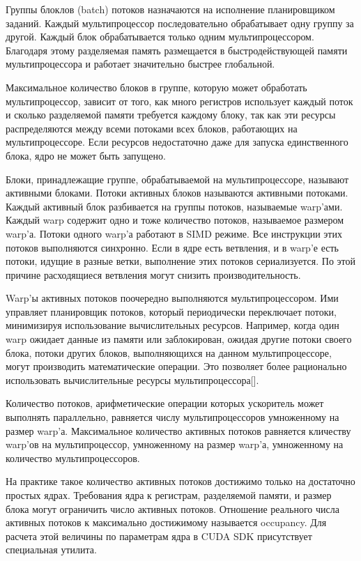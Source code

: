Группы блоклов (batch) потоков назначаются на исполнение планировщиком заданий. Каждый мультипроцессор последовательно обрабатывает одну группу за другой. Каждый блок обрабатывается только одним мультипроцессором. Благодаря этому разделяемая память размещается в быстродействующей памяти мультипроцессора и работает значительно быстрее глобальной.

Максимальное количество блоков в группе, которую может обработать мультипроцессор, зависит от того, как много регистров использует каждый поток и сколько разделяемой памяти требуется каждому блоку, так как эти ресурсы распределяются между всеми потоками всех блоков, работающих на мультипроцессоре. Если ресурсов недостаточно даже для запуска единственного блока, ядро не может быть запущено.

Блоки, принадлежащие группе, обрабатываемой на мультипроцессоре, называют активными блоками. Потоки активных блоков называются активными потоками. Каждый активный блок разбивается на группы потоков, называемые warp'ами. Каждый warp содержит одно и тоже количество потоков, называемое размером warp'а. Потоки одного warp'а работают в SIMD режиме. Все инструкции этих потоков выполняются синхронно. Если в ядре есть ветвления, и в warp'е есть потоки, идущие в разные ветки, выполнение этих потоков сериализуется. По этой причине расходящиеся ветвления могут снизить производительность.

Warp'ы активных потоков поочередно выполняются мультипроцессором. Ими управляет планировщик потоков, который периодически переключает потоки, минимизируя использование вычислительных ресурсов. Например, когда один warp ожидает данные из памяти или заблокирован, ожидая другие потоки своего блока, потоки других блоков, выполняющихся на данном мультипроцессоре, могут производить математические операции. Это позволяет более рационально использовать вычислительные ресурсы мультипроцессора[].

Количество потоков, арифметические операции которых ускоритель может выполнять параллельно, равняется числу мультипроцессоров умноженному на размер warp'а. Максимальное количество активных потоков равняется кличеству warp'ов на мультипроцессор, умноженному на размер warp'а, умноженному на количество мультипроцессоров. 

На практике такое количество активных потоков достижимо только на достаточно простых ядрах. Требования ядра к регистрам, разделяемой памяти, и размер блока могут ограничить число активных потоков. Отношение реального числа активных потоков к максимально достижимому называется occupancy. Для расчета этой величины по параметрам ядра в CUDA SDK присутствует специальная утилита.

